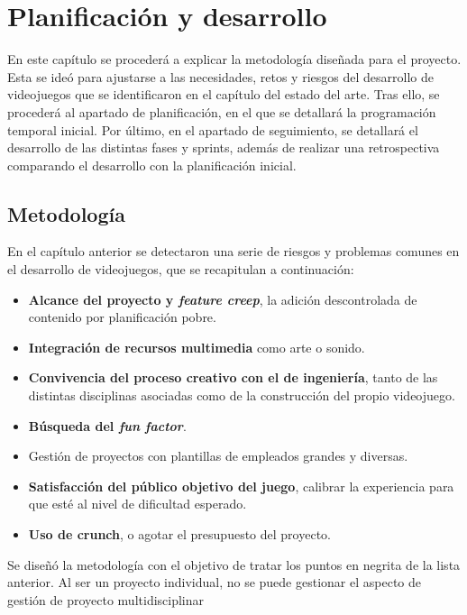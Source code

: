 \chapter{Planificación y desarrollo}

En este capítulo se procederá a explicar la metodología diseñada para el proyecto. Esta se ideó para ajustarse a las necesidades, retos y riesgos del desarrollo de videojuegos que se identificaron en el capítulo del estado del arte. Tras ello, se procederá al apartado de planificación, en el que se detallará la programación temporal inicial. Por último, en el apartado de seguimiento, se detallará el desarrollo de las distintas fases y sprints, además de realizar una retrospectiva comparando el desarrollo con la planificación inicial.

\section{Metodología}

En el capítulo anterior se detectaron una serie de riesgos y problemas comunes en el desarrollo de videojuegos, que se recapitulan a continuación:

\begin{itemize}
    \item \textbf{Alcance del proyecto y \textit{feature creep}}, la adición descontrolada de contenido por planificación pobre.
    \item \textbf{Integración de recursos multimedia} como arte o sonido.
    \item \textbf{Convivencia del proceso creativo con el de ingeniería}, tanto de las distintas disciplinas asociadas como de la construcción del propio videojuego.
    \item \textbf{Búsqueda del \textit{fun factor}}.
    \item Gestión de proyectos con plantillas de empleados grandes y diversas.
    \item \textbf{Satisfacción del público objetivo del juego}, calibrar la experiencia para que esté al nivel de dificultad esperado.
    \item \textbf{Uso de crunch}, o agotar el presupuesto del proyecto.
\end{itemize}

Se diseñó la metodología con el objetivo de tratar los puntos en negrita de la lista anterior. Al ser un proyecto individual, no se puede gestionar el aspecto de gestión de proyecto multidisciplinar 


